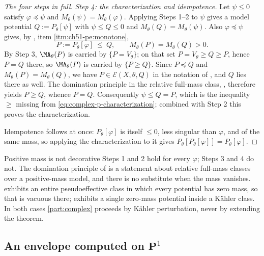 \begin{proof}[The four steps in full]
\emph{Step 4: the characterization and idempotence.}  Let \(\psi\leq0\)
satisfy \(\varphi\preceq\psi\) and
\(M_\theta(\psi)=M_\theta(\varphi)\).  Applying Steps 1--2 to \(\psi\)
gives a model potential \(Q:=P_\theta[\psi]\) with
\(\psi\leq Q\leq0\) and \(M_\theta(Q)=M_\theta(\psi)\).  Also
\(\varphi\preceq\psi\) gives, by
, item \cref{itm:ch51-pe:monotone},
\[
 P:=P_\theta[\varphi]\ \leq\ Q,
 \qquad
 M_\theta(P)=M_\theta(Q)>0 .
\]
By Step 3, \(\MA_\theta(P)\) is carried by \(\{P=V_\theta\}\); on that
set \(P=V_\theta\geq Q\geq P\), hence \(P=Q\) there, so
\(\MA_\theta(P)\) is carried by \(\{P\geq Q\}\).  Since \(P\preceq Q\)
and \(M_\theta(P)=M_\theta(Q)\), we have \(P\in\mathcal E(X,\theta,Q)\)
in the notation of , and \(Q\) lies
there as well.  The domination principle in the relative full-mass class,
, therefore yields \(P\geq Q\), whence
\(P=Q\).  Consequently \(\psi\leq Q=P\), which is the inequality
\(\geq\) missing from \eqref{eq:complex-p-characterization}; combined
with Step 2 this proves the characterization.

Idempotence follows at once: \(P_\theta[\varphi]\) is itself
\(\leq0\), less singular than \(\varphi\), and of the same mass, so
applying the characterization to it gives
\(P_\theta[P_\theta[\varphi]]=P_\theta[\varphi]\).
\end{proof}

\begin{warning}{Positive mass is not decorative}
\label{warn:ch51-p-positive-mass}
Steps 1 and 2 hold for every \(\varphi\); Steps 3 and 4 do not.  The
domination principle of  is a statement about
relative full-mass classes over a positive-mass model, and there is no
substitute when the mass vanishes.  
exhibits an entire pseudoeffective class in which every potential has
zero mass, so that  is vacuous there;
 exhibits a single zero-mass potential inside a
K\"ahler class.  In both cases \cref{part:complex} proceeds by K\"ahler
perturbation, never by extending the theorem.
\end{warning}

\subsection{An envelope computed on
\texorpdfstring{\(\mathbf P^1\)}{P1}}
\label{sec:ch51-p1-envelope}

